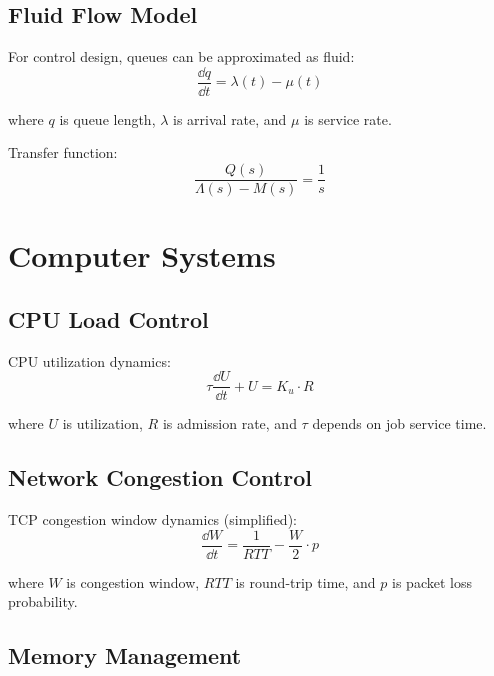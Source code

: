 

\subsection{Fluid Flow Model}

For control design, queues can be approximated as fluid:
\begin{equation}
\frac{\dd q}{\dd t} = \lambda(t) - \mu(t)
\end{equation}

where $q$ is queue length, $\lambda$ is arrival rate, and $\mu$ is service rate.

Transfer function:
\begin{equation}
\frac{Q(s)}{\Lambda(s) - M(s)} = \frac{1}{s}
\end{equation}

\section{Computer Systems}
\label{sec:computer_systems}

\subsection{CPU Load Control}

CPU utilization dynamics:
\begin{equation}
\tau\frac{\dd U}{\dd t} + U = K_u \cdot R
\end{equation}

where $U$ is utilization, $R$ is admission rate, and $\tau$ depends on job service time.

\subsection{Network Congestion Control}

TCP congestion window dynamics (simplified):
\begin{equation}
\frac{\dd W}{\dd t} = \frac{1}{RTT} - \frac{W}{2} \cdot p
\end{equation}

where $W$ is congestion window, $RTT$ is round-trip time, and $p$ is packet loss probability.

\subsection{Memory Management}

